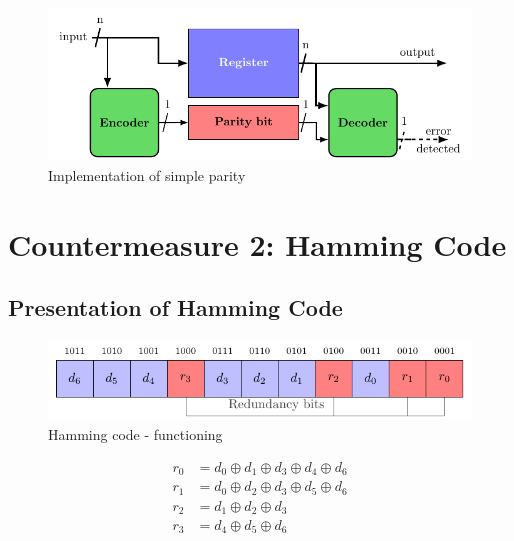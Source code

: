 \begin{figure}[ht]
    \centering
    \includegraphics[page=1]{c5_countermeasures_dift/img/archi_contremesures.pdf}
    \caption{Implementation of simple parity}
    \label{fig:implementation_sp}
\end{figure}


\section{Countermeasure 2: Hamming Code}
\label{chapter:hammingcode}

\subsection{Presentation of Hamming Code}

\begin{figure}[ht]
    \centering
    \includegraphics[page=1]{c5_countermeasures_dift/img/hamming_bit.pdf}
    \caption{Hamming code - functioning}
    \label{fig:hamming_functionning}
\end{figure}

\begin{equation} \label{equat:hamming_encoder}
    \begin{split}
        r_{0} &= d_{0} \oplus d_{1} \oplus d_{3} \oplus d_{4} \oplus d_{6} \\
        r_{1} &= d_{0} \oplus d_{2} \oplus d_{3} \oplus d_{5} \oplus d_{6} \\
        r_{2} &= d_{1} \oplus d_{2} \oplus d_{3} \\
        r_{3} &= d_{4} \oplus d_{5} \oplus d_{6}
    \end{split}
\end{equation}

